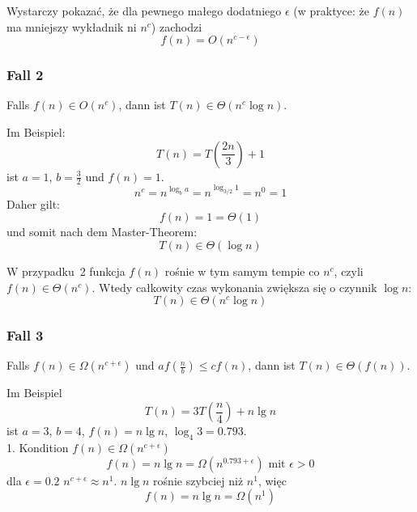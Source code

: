     \begin{tcolorbox}[red = {Podsumowanie}]
        Wystarczy pokazać, że dla pewnego małego dodatniego $\epsilon$ (w praktyce: że $f(n)$ ma mniejszy wykładnik ni $n^c$) zachodzi 
        \[
        f(n) = O(n^{c - \epsilon})
        \]
    \end{tcolorbox}

\subsubsection{Fall 2}
    \begin{tcolorbox}[blue = {Definition}]
        Falls $f(n) \in O(n^{c})$, dann ist $T(n) \in \Theta(n^{c}\log n)$.
    \end{tcolorbox}

    Im Beispiel:
    \[
    T(n) = T\!\left(\frac{2n}{3}\right) + 1
    \]
    ist $a = 1$, $b = \tfrac{3}{2}$ und $f(n) = 1$.
    \[
    n^c = n^{\log_b a} = n^{\log_{3/2} 1} = n^0 = 1
    \]
    Daher gilt:
    \[
    f(n) = 1 = \Theta(1)
    \]
    und somit nach dem Master-Theorem:
    \[
    T(n) \in \Theta(\log n)
    \]

    \begin{tcolorbox}[red = {Podsumowanie}]
    W przypadku~2 funkcja $f(n)$ rośnie w tym samym tempie co $n^c$,  
    czyli $f(n) \in \Theta(n^c)$.  
    Wtedy całkowity czas wykonania zwiększa się o czynnik $\log n$:
    \[
    T(n) \in \Theta(n^c \log n)
    \]
    \end{tcolorbox}

\subsubsection{Fall 3}
    \begin{tcolorbox}[blue = {Definition}]
        Falls $f(n) \in \Omega(n^{c + \epsilon})$ und $af(\frac{n}{b}) \leq cf(n)$, dann ist $T(n) \in \Theta(f(n))$.
    \end{tcolorbox}

    Im Beispiel
    \[
    T(n) = 3T(\frac{n}{4}) + n \lg n
    \]
    ist $a = 3$, $b = 4$, $f(n) = n \lg n$, $\log_4 3 = 0.793$. \\[1em]
    1. Kondition $f(n) \in \Omega(n^{c + \epsilon})$
    \[
    f(n) = n \lg n = \Omega(n^{0.793 + \epsilon}) \text{ mit } \epsilon > 0
    \]
    dla $\epsilon = 0.2$ $n^{c + \epsilon} \approx n^1$. $n \lg n$ rośnie szybciej niż $n^1$, więc 
    \[
        f(n) = n \lg n = \Omega(n^1)    
    \]

